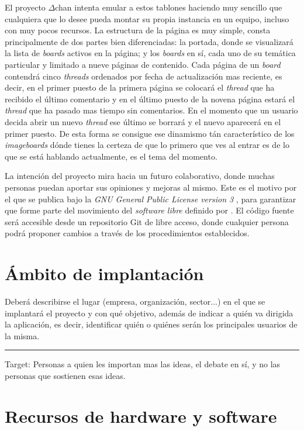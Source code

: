\documentclass[12pt,a4paper,titlepage]{article}
\newcommand\Dchan{$\Delta$chan}
\begin{document}
    El proyecto {\Dchan} intenta emular a estos tablones haciendo muy sencillo que cualquiera que lo desee pueda montar su propia instancia en un equipo, incluso con muy pocos recursos. La estructura de la página es muy simple, consta principalmente de dos partes bien diferenciadas: la portada, donde se visualizará la lista de \textit{boards} activos en la página; y los \textit{boards} en sí, cada uno de su temática particular y limitado a nueve páginas de contenido. Cada página de un \textit{board} contendrá cinco \textit{threads} ordenados por fecha de actualización mas reciente, es decir, en el primer puesto de la primera página se colocará el \textit{thread} que ha recibido el último comentario y en el último puesto de la novena página estará el \textit{thread} que ha pasado mas tiempo sin comentarios. En el momento que un usuario decida abrir un nuevo \textit{thread} ese último se borrará y el nuevo aparecerá en el primer puesto. De esta forma se consigue ese dinamismo tán característico de los \textit{imageboards} dónde tienes la certeza de que lo primero que ves al entrar es de lo que se está hablando actualmente, es el tema del momento.

    La intención del proyecto mira hacia un futuro colaborativo, donde muchas personas puedan aportar sus opiniones y mejoras al mismo. Este es el motivo por el que se publica bajo la \emph{GNU General Public License version 3} \cite{gnugplv3}, para garantizar que forme parte del movimiento del \emph{software libre} definido por \textcite{libresoftwaredefinition}. El código fuente será accesible desde un repositorio Git de libre acceso, donde cualquier persona podrá proponer cambios a través de los procedimientos establecidos.

    \section{Ámbito de implantación}

    Deberá describirse el lugar (empresa, organización, sector...) en el que se implantará el proyecto y con qué objetivo, además de indicar a quién va dirigida la aplicación, es decir, identificar quién o quiénes serán los principales usuarios de la misma.

    \bigskip\hrule\bigskip

    Target: Personas a quien les importan mas las ideas, el debate en sí, y no las personas que sostienen esas ideas.

    \section{Recursos de hardware y software}
\end{document}
